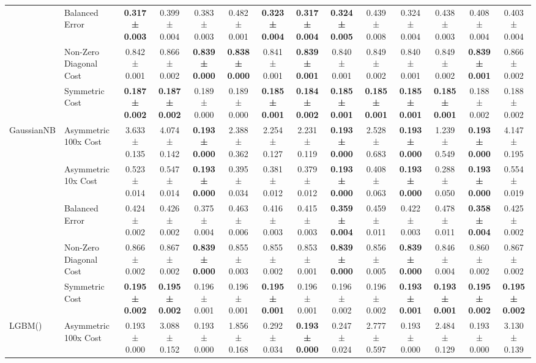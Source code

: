 \begin{table}[H]
{\begin{tabular}{llcccccccccccc}
 & Balanced Error & \textbf{0.317 ± 0.003} & 0.399 ± 0.004 & 0.383 ± 0.003 & 0.482 ± 0.001 & \textbf{0.323 ± 0.004} & \textbf{0.317 ± 0.004} & \textbf{0.324 ± 0.005} & 0.439 ± 0.008 & 0.324 ± 0.004 & 0.438 ± 0.003 & 0.408 ± 0.004 & 0.403 ± 0.004 \\
 & Non-Zero Diagonal Cost & 0.842 ± 0.001 & 0.866 ± 0.002 & \textbf{0.839 ± 0.000} & \textbf{0.838 ± 0.000} & 0.841 ± 0.001 & \textbf{0.839 ± 0.001} & 0.840 ± 0.001 & 0.849 ± 0.002 & 0.840 ± 0.001 & 0.849 ± 0.002 & \textbf{0.839 ± 0.001} & 0.866 ± 0.002 \\
 & Symmetric Cost & \textbf{0.187 ± 0.002} & \textbf{0.187 ± 0.002} & 0.189 ± 0.000 & 0.189 ± 0.000 & \textbf{0.185 ± 0.001} & \textbf{0.184 ± 0.002} & \textbf{0.185 ± 0.001} & \textbf{0.185 ± 0.001} & \textbf{0.185 ± 0.001} & \textbf{0.185 ± 0.001} & 0.188 ± 0.002 & 0.188 ± 0.002 \\
\cline{1-14}
\multirow[t]{5}{*}{GaussianNB} & Asymmetric 100x Cost & 3.633 ± 0.135 & 4.074 ± 0.142 & \textbf{0.193 ± 0.000} & 2.388 ± 0.362 & 2.254 ± 0.127 & 2.231 ± 0.119 & \textbf{0.193 ± 0.000} & 2.528 ± 0.683 & \textbf{0.193 ± 0.000} & 1.239 ± 0.549 & \textbf{0.193 ± 0.000} & 4.147 ± 0.195 \\
 & Asymmetric 10x Cost & 0.523 ± 0.014 & 0.547 ± 0.014 & \textbf{0.193 ± 0.000} & 0.395 ± 0.034 & 0.381 ± 0.012 & 0.379 ± 0.012 & \textbf{0.193 ± 0.000} & 0.408 ± 0.063 & \textbf{0.193 ± 0.000} & 0.288 ± 0.050 & \textbf{0.193 ± 0.000} & 0.554 ± 0.019 \\
 & Balanced Error & 0.424 ± 0.002 & 0.426 ± 0.002 & 0.375 ± 0.004 & 0.463 ± 0.006 & 0.416 ± 0.003 & 0.415 ± 0.003 & \textbf{0.359 ± 0.004} & 0.459 ± 0.011 & 0.422 ± 0.003 & 0.478 ± 0.011 & \textbf{0.358 ± 0.004} & 0.425 ± 0.002 \\
 & Non-Zero Diagonal Cost & 0.866 ± 0.002 & 0.867 ± 0.002 & \textbf{0.839 ± 0.000} & 0.855 ± 0.003 & 0.855 ± 0.002 & 0.853 ± 0.001 & \textbf{0.839 ± 0.000} & 0.856 ± 0.005 & \textbf{0.839 ± 0.000} & 0.846 ± 0.004 & 0.860 ± 0.002 & 0.867 ± 0.002 \\
 & Symmetric Cost & \textbf{0.195 ± 0.002} & \textbf{0.195 ± 0.002} & 0.196 ± 0.001 & 0.196 ± 0.001 & \textbf{0.195 ± 0.001} & 0.196 ± 0.001 & 0.196 ± 0.002 & 0.196 ± 0.002 & \textbf{0.193 ± 0.001} & \textbf{0.193 ± 0.001} & \textbf{0.195 ± 0.002} & \textbf{0.195 ± 0.002} \\
\cline{1-14}
\multirow[t]{5}{*}{LGBM()} & Asymmetric 100x Cost & 0.193 ± 0.000 & 3.088 ± 0.152 & 0.193 ± 0.000 & 1.856 ± 0.168 & 0.292 ± 0.034 & \textbf{0.193 ± 0.000} & 0.247 ± 0.024 & 2.777 ± 0.597 & 0.193 ± 0.000 & 2.484 ± 0.129 & 0.193 ± 0.000 & 3.130 ± 0.139 \\

\end{tabular}}
\end{table}
